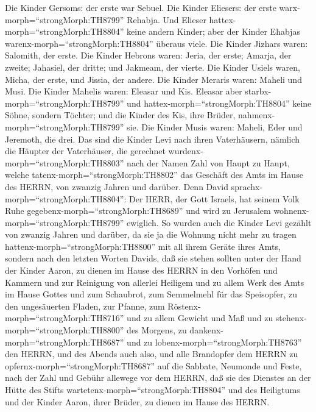  Die Kinder Gersoms: der erste war Sebuel. 
Die Kinder Eliesers: der erste warx-morph=``strongMorph:TH8799''
Rehabja. Und Elieser hattex-morph=``strongMorph:TH8804'' keine andern
Kinder; aber der Kinder Ehabjas warenx-morph=``strongMorph:TH8804''
überaus viele.  Die Kinder Jizhars waren: Salomith, der
erste.  Die Kinder Hebrons waren: Jeria, der erste; Amarja,
der zweite; Jahasiel, der dritte; und Jakmeam, der vierte. 
Die Kinder Usiels waren, Micha, der erste, und Jissia, der andere.
 Die Kinder Meraris waren: Maheli und Musi. Die Kinder
Mahelis waren: Eleasar und Kis.  Eleasar aber
starbx-morph=``strongMorph:TH8799'' und
hattex-morph=``strongMorph:TH8804'' keine Söhne, sondern Töchter; und
die Kinder des Kis, ihre Brüder, nahmenx-morph=``strongMorph:TH8799''
sie.  Die Kinder Musis waren: Maheli, Eder und Jeremoth,
die drei.  Das sind die Kinder Levi nach ihren
Vaterhäusern, nämlich die Häupter der Vaterhäuser, die gerechnet
wurdenx-morph=``strongMorph:TH8803'' nach der Namen Zahl von Haupt zu
Haupt, welche tatenx-morph=``strongMorph:TH8802'' das Geschäft des Amts
im Hause des HERRN, von zwanzig Jahren und darüber.  Denn
David sprachx-morph=``strongMorph:TH8804'': Der HERR, der Gott Israels,
hat seinem Volk Ruhe gegebenx-morph=``strongMorph:TH8689'' und wird zu
Jerusalem wohnenx-morph=``strongMorph:TH8799'' ewiglich. 
So wurden auch die Kinder Levi gezählt von zwanzig Jahren und darüber,
da sie ja die Wohnung nicht mehr zu tragen
hattenx-morph=``strongMorph:TH8800'' mit all ihrem Geräte ihres Amts,
 sondern nach den letzten Worten Davids,  daß
sie stehen sollten unter der Hand der Kinder Aaron, zu dienen im Hause
des HERRN in den Vorhöfen und Kammern und zur Reinigung von allerlei
Heiligem und zu allem Werk des Amts im Hause Gottes  und
zum Schaubrot, zum Semmelmehl für das Speisopfer, zu den ungesäuerten
Fladen, zur Pfanne, zum Röstenx-morph=``strongMorph:TH8716'' und zu
allem Gewicht und Maß  und zu
stehenx-morph=``strongMorph:TH8800'' des Morgens, zu
dankenx-morph=``strongMorph:TH8687'' und zu
lobenx-morph=``strongMorph:TH8763'' den HERRN, und des Abends auch also,
 und alle Brandopfer dem HERRN zu
opfernx-morph=``strongMorph:TH8687'' auf die Sabbate, Neumonde und
Feste, nach der Zahl und Gebühr allewege vor dem HERRN, 
daß sie des Dienstes an der Hütte des Stifts
wartetenx-morph=``strongMorph:TH8804'' und des Heiligtums und der Kinder
Aaron, ihrer Brüder, zu dienen im Hause des HERRN.

